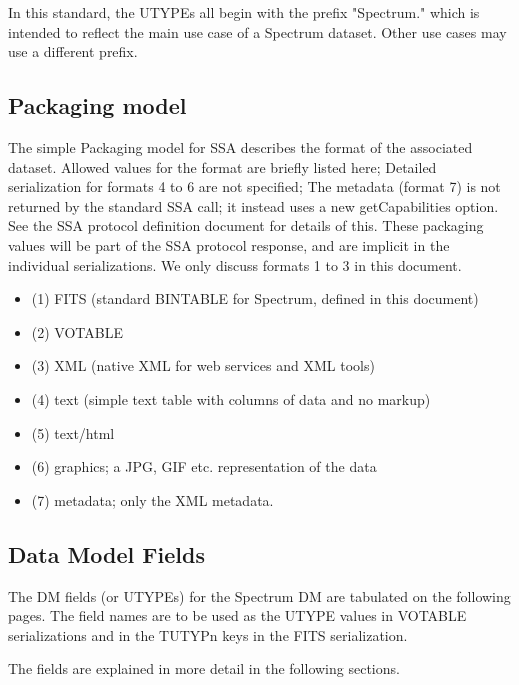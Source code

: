 \documentclass[11pt]{article}
\begin{document}
In this standard, the UTYPEs all begin with the prefix "Spectrum." which
is intended to reflect the main use case of a Spectrum dataset. Other use cases
may use a different prefix.


\subsection{Packaging model}

The simple Packaging model for SSA 
describes the format of the associated dataset.
Allowed values for the format are briefly listed here;
Detailed serialization for
formats 4 to 6 are not specified;
The metadata (format 7)
is not returned by the standard SSA call; it instead uses a new getCapabilities option. 
See the SSA protocol definition document for details of this.
These packaging values will be part of the SSA protocol response,
and are implicit in the individual serializations. We only discuss formats 1 to 3
in this document.



\colorbox{ipink}{
\begin{minipage}{0.9\textwidth}
\begin{itemize}
\item (1) FITS (standard BINTABLE for Spectrum, defined in this document)
\item (2) VOTABLE  
\item (3) XML  (native XML for web services and XML tools)
\item (4) text  (simple text table with columns of data and no markup)
\item (5) text/html
\item (6) graphics; a JPG, GIF etc. representation of the data
\item (7) metadata; only the XML metadata.

\end{itemize}
\end{minipage}
}

\subsection{Data Model Fields}

The DM fields (or UTYPEs) for the Spectrum DM are tabulated on the following 
pages. The field names are to be used as the UTYPE values in VOTABLE serializations
and in the TUTYPn keys in the FITS serialization.

The fields are explained in more detail in the following
sections.
\end{document}
